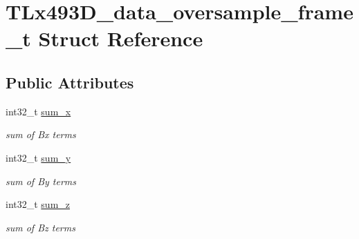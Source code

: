 \hypertarget{struct_t_lx493_d__data__oversample__frame__t}{}\section{T\+Lx493\+D\+\_\+data\+\_\+oversample\+\_\+frame\+\_\+t Struct Reference}
\label{struct_t_lx493_d__data__oversample__frame__t}
\subsection*{Public Attributes}
\begin{DoxyCompactItemize}
\item 
\mbox{\label{struct_t_lx493_d__data__oversample__frame__t_a1b2b76ad2f77cc31bb6b5b4f86afacfe}} 
int32\+\_\+t \mbox{\hyperlink{struct_t_lx493_d__data__oversample__frame__t_a1b2b76ad2f77cc31bb6b5b4f86afacfe}{sum\+\_\+x}}
\begin{DoxyCompactList}\small\item\em sum of Bx terms \end{DoxyCompactList}\item 
\mbox{\label{struct_t_lx493_d__data__oversample__frame__t_afa5d10ee5883bc241b411acaef2ea9fb}} 
int32\+\_\+t \mbox{\hyperlink{struct_t_lx493_d__data__oversample__frame__t_afa5d10ee5883bc241b411acaef2ea9fb}{sum\+\_\+y}}
\begin{DoxyCompactList}\small\item\em sum of By terms \end{DoxyCompactList}\item 
\mbox{\label{struct_t_lx493_d__data__oversample__frame__t_a7dd5ced8999ea8ddb22e2a8af7e304b5}} 
int32\+\_\+t \mbox{\hyperlink{struct_t_lx493_d__data__oversample__frame__t_a7dd5ced8999ea8ddb22e2a8af7e304b5}{sum\+\_\+z}}
\begin{DoxyCompactList}\small\item\em sum of Bz terms \end{DoxyCompactList}\item 
\mbox{\label{struct_t_lx493_d__data__oversample__frame__t_a40effa7ffb501cdee7a69a7801f105a3}} 

\end{DoxyCompactItemize}
